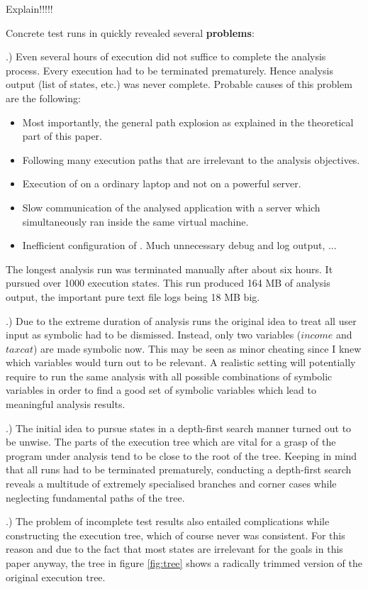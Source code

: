 Explain!!!!!\todo{!}

\bigskip

Concrete test runs in \sse quickly revealed several \textbf{problems}:

.) Even several hours of execution did not suffice to complete the analysis process.
Every execution had to be terminated prematurely.
Hence analysis output (list of states, etc.) was never complete.
Probable causes of this problem are the following: 
\begin{itemize}
\item Most importantly, the general path explosion as explained in the theoretical part of this paper.
\item Following many execution paths that are irrelevant to the analysis objectives.
\item Execution of \sse on a ordinary laptop and not on a powerful server.
\item Slow communication of the analysed application with a server which simultaneously ran inside the same virtual machine.
\item Inefficient configuration of \sse. Much unnecessary debug and log output, ...
\end{itemize}
The longest analysis run was terminated manually after about six hours.
It pursued over 1000 execution states.
This run produced 164 MB of analysis output, the important pure text file logs being 18 MB big.

.) Due to the extreme duration of analysis runs the original idea to treat all user input as symbolic had to be dismissed. Instead, only two variables ($income$ and $taxcat$) are made symbolic now.
This may be seen as minor cheating since I knew which variables would turn out to be relevant.
A realistic setting will potentially require to run the same analysis with all possible combinations of symbolic variables in order to find a good set of symbolic variables which lead to meaningful analysis results.

.) The initial idea to pursue states in a depth-first search manner turned out to be unwise.
The parts of the execution tree which are vital for a grasp of the program under analysis tend to be close to the root of the tree.
Keeping in mind that all \sse runs had to be terminated prematurely, conducting a depth-first search reveals a multitude of extremely specialised branches and corner cases while neglecting fundamental paths of the tree.

.) The problem of incomplete test results also entailed complications while constructing the execution tree, which of course never was consistent.
For this reason and due to the fact that most states are irrelevant for the goals in this paper anyway, the tree in figure \ref{fig:tree} shows a radically trimmed version of the original execution tree.

